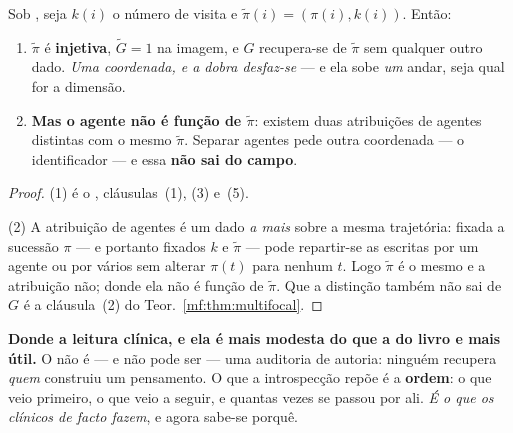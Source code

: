 \documentclass[../livro.tex]{subfiles}
\begin{document}
\begin{teorema}\label{mf:thm:folha}
Sob , seja $k(i)$ o número de visita e $\tilde\pi(i)=(\pi(i),k(i))$. Então:
\begin{enumerate}\itemsep3pt
\item[(1)] $\tilde\pi$ é \textbf{injetiva}, $\tilde G=1$ na imagem, e $G$
recupera-se de $\tilde\pi$ sem qualquer outro dado. \emph{Uma coordenada, e a
dobra desfaz-se} --- e ela sobe \emph{um} andar, seja qual for a dimensão.
\item[(2)] \textbf{Mas o agente não é função de $\tilde\pi$}: existem duas
atribuições de agentes distintas com o mesmo $\tilde\pi$. Separar agentes pede
outra coordenada --- o identificador --- e essa \textbf{não sai do campo}.
\end{enumerate}
\end{teorema}

\begin{proof}
(1) é o , cláusulas~(1),
(3) e~(5).

(2) A atribuição de agentes é um dado \emph{a mais} sobre a mesma trajetória:
fixada a sucessão $\pi$ --- e portanto fixados $k$ e $\tilde\pi$ --- pode
repartir-se as escritas por um agente ou por vários sem alterar $\pi(t)$ para
nenhum $t$. Logo $\tilde\pi$ é o mesmo e a atribuição não; donde ela não é
função de $\tilde\pi$. Que a distinção também não sai de $G$ é a cláusula~(2) do
Teor.~\ref{mf:thm:multifocal}.
\end{proof}

\medskip\noindent\textbf{Donde a leitura clínica, e ela é mais modesta do que a
do livro e mais útil.} O  não é --- e não pode ser ---
uma auditoria de autoria: ninguém recupera \emph{quem} construiu um pensamento.
O que a introspecção repõe é a \textbf{ordem}: o que veio primeiro, o que veio a
seguir, e quantas vezes se passou por ali. \emph{É o que os clínicos de facto
fazem}, e agora sabe-se porquê.

\end{document}
